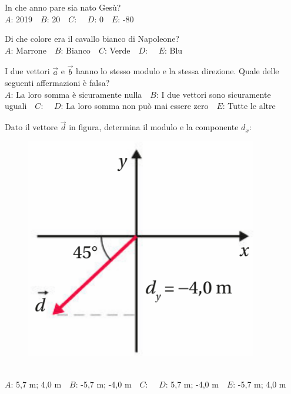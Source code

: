 \mcquestionfooter



\def\mcquestionnumber{5}


\mcquestionheader In che anno pare sia nato Gesù?\\
{$A$}: 2019\ \ {$B$}: 20\ \ {$C$}: \ \ {$D$}: 0\ \ {$E$}: -80\ \ 

\mcquestionfooter



\def\mcquestionnumber{6}


\mcquestionheader Di che colore era il cavallo bianco di Napoleone?\\
{$A$}: Marrone\ \ {$B$}: Bianco\ \ {$C$}: Verde\ \ {$D$}: \ \ {$E$}: Blu\ \ 

\mcquestionfooter



\def\mcquestionnumber{7}


\mcquestionheader I due vettori $\vec{a}$ e $\vec{b}$ hanno lo stesso modulo e la stessa direzione. Quale delle seguenti affermazioni è falsa?\\
{$A$}: La loro somma è sicuramente nulla\ \ {$B$}: I due vettori sono sicuramente uguali\ \ {$C$}: \ \ {$D$}: La loro somma non può mai essere zero\ \ {$E$}: Tutte le altre\ \ 

\mcquestionfooter



\def\mcquestionnumber{8}


\mcquestionheader Dato il vettore $\vec{d}$ in figura, determina il modulo e la componente $d_x$: \begin{figure}[h!]   \begin{center}     \includegraphics[scale=0.35]{vettored.png}   \end{center} \end{figure}\\
{$A$}: 5,7 m; 4,0 m\ \ {$B$}: -5,7 m; -4,0 m\ \ {$C$}: \ \ {$D$}: 5,7 m; -4,0 m\ \ {$E$}: -5,7 m; 4,0 m\ \ 

